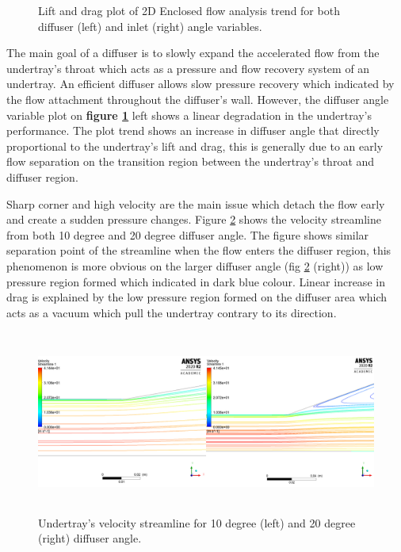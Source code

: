 \begin{figure}[!ht]
  \noindent
  \caption{Lift and drag plot of 2D Enclosed flow analysis trend for both diffuser (left) and inlet (right) angle variables. }
  \label{fig:2D_EN_result}
\end{figure}

\noindent The main goal of a diffuser is to slowly expand the accelerated flow from the undertray's throat which acts as a pressure and flow recovery system of an undertray. An efficient diffuser allows slow pressure recovery which indicated by the flow attachment throughout the diffuser's wall. However, the diffuser angle variable plot on \textbf{figure \ref{fig:2D_EN_result}} left shows a linear degradation in the undertray's performance. The plot trend shows an increase in diffuser angle that directly proportional to the undertray's lift and drag, this is generally due to an early flow separation on the transition region between the undertray's throat and diffuser region. 

\noindent Sharp corner and high velocity are the main issue which detach the flow early and create a sudden pressure changes. Figure \ref{fig:2D_EN_streamline_compare} shows the velocity streamline from both 10 degree and 20 degree diffuser angle. The figure shows similar separation point of the streamline when the flow enters the diffuser region, this phenomenon is more obvious on the larger diffuser angle (fig \ref{fig:2D_EN_streamline_compare} (right)) as low pressure region formed which indicated in dark blue colour. Linear increase in drag is explained by the low pressure region formed on the diffuser area which acts as a vacuum which pull the undertray contrary to its direction.  

\begin{figure}[!ht]
    \centering
    \includegraphics[height= 6cm]{Figures/2D_EN/2D_EN_Streamline_compare.PNG}
    \caption{Undertray's velocity streamline for 10 degree (left) and 20 degree (right) diffuser angle.}
    \label{fig:2D_EN_streamline_compare}
\end{figure}


